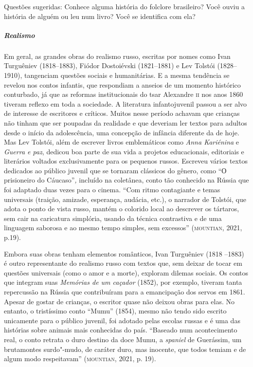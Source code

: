 \documentclass[11pt]{extarticle}
\begin{document}
Questões sugeridas:
Conhece alguma história do folclore brasileiro? Você ouviu a história de
alguém ou leu num livro? Você se identifica com ela?




\subparagraph{Realismo}
Em geral, as grandes obras
do realismo russo, escritas por nomes como Ivan Turguêniev (1818--1883),
Fiódor Dostoiévski (1821--1881) e Lev Tolstói (1828--1910), tangenciam
questões sociais e humanitárias. E a mesma tendência se revelou nos
contos infantis, que respondiam a anseios de um momento histórico
conturbado, já que as reformas institucionais do tsar Alexandre \textsc{ii} nos
anos 1860 tiveram reflexo em toda a sociedade. A literatura
infantojuvenil passou a ser alvo de interesse de escritores e críticos.
Muitos nesse período achavam que crianças não tinham que ser poupadas da
realidade e que deveriam ler textos para adultos desde o início da
adolescência, uma concepção de infância diferente da de hoje. Mas Lev
Tolstói, além de escrever livros emblemáticos como \emph{Anna Kariénina}
e \emph{Guerra e paz}, dedicou boa parte de sua vida a projetos
educacionais, editoriais e literários voltados exclusivamente para os
pequenos russos. Escreveu vários textos dedicados ao público juvenil que
se tornaram clássicos do gênero, como ``О prisioneiro do
Cáucaso''\emph{,} incluído na coletânea, conto tão conhecido na Rússia
que foi adaptado duas vezes para o cinema. ``Com ritmo contagiante e
temas universais (traição, amizade, esperança, audácia, etc.), o
narrador de Tolstói, que adota o ponto de vista russo, mantém o colorido
local ao descrever os tártaros, sem cair na caricatura simplória, usando
da técnica contrastiva e de uma linguagem saborosa e ao mesmo tempo
simples, sem excessos'' (\textsc{mountian}, 2021, p.19).


Embora suas obras tenham elementos românticos, Ivan Turguêniev (1818
--1883) é outro representante do realismo russo com textos que, sem
deixar de tocar em questões universais (como o amor e a morte), exploram
dilemas sociais. Os contos que integram suas \emph{Memórias de um
caçador} (1852), por exemplo, tiveram tanta repercussão na Rússia que
contribuíram para a emancipação dos servos em 1861. Apesar de gostar de
crianças, o escritor quase não deixou obras para elas. No entanto, o
tristíssimo conto ``Mumu'' (1854), mesmo não tendo sido escrito
unicamente para o público juvenil, foi adotado pelas escolas russas e é
uma das histórias sobre animais mais conhecidas do país. ``Baseado num acontecimento real, o conto retrata o duro destino da doce Mumu, a \emph{spaniel} de
Guerássim, um brutamontes surdo"-mudo, de caráter duro, mas inocente, que
todos temiam e de algum modo respeitavam'' (\textsc{mountian}, 2021, p. 19).
\end{document}
